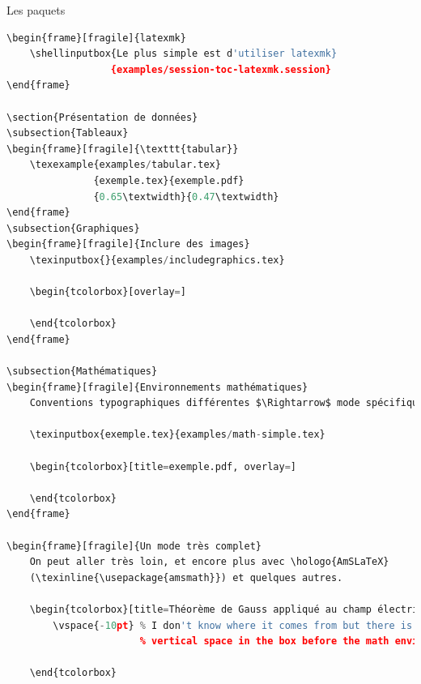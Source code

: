 \documentclass[usenames,dvipsnames,10pt]{beamer} %
\newcommand{\texinputbox}[2]{
    \begin{tcolorbox}[title=#1,colframe=PineGreen]
        \selectlanguage{english}
        \texinput{#2}
    \end{tcolorbox}
}
\newcommand{\texexample}[5]{
    \begin{columns}
        \begin{column}{#4}
            \texinputbox{#2}{#1}
        \end{column}

        \begin{column}{#5}
            \begin{tcolorbox}[title=#3, overlay=]
                
            \end{tcolorbox}
        \end{column}
    \end{columns}
}
\newcommand{\shellinputbox}[2]{
    \begin{tcolorbox}[title=#1,overlay=,colframe=Violet]
        \selectlanguage{english}
        \shellinput{#2}
    \end{tcolorbox}
}
\begin{document}
\begin{frame}[fragile]{Les paquets}
\begin{description}
{\begin{lstlisting}[language=Python]
\begin{frame}[fragile]{latexmk}
    \shellinputbox{Le plus simple est d'utiliser latexmk}
                  {examples/session-toc-latexmk.session}
\end{frame}

\section{Présentation de données}
\subsection{Tableaux}
\begin{frame}[fragile]{\texttt{tabular}}
    \texexample{examples/tabular.tex}
               {exemple.tex}{exemple.pdf}
               {0.65\textwidth}{0.47\textwidth}
\end{frame}
\subsection{Graphiques}
\begin{frame}[fragile]{Inclure des images}
    \texinputbox{}{examples/includegraphics.tex}

    \begin{tcolorbox}[overlay=]
        
    \end{tcolorbox}
\end{frame}

\subsection{Mathématiques}
\begin{frame}[fragile]{Environnements mathématiques}
    Conventions typographiques différentes $\Rightarrow$ mode spécifique:

    \texinputbox{exemple.tex}{examples/math-simple.tex}

    \begin{tcolorbox}[title=exemple.pdf, overlay=]
        
    \end{tcolorbox}
\end{frame}

\begin{frame}[fragile]{Un mode très complet}
    On peut aller très loin, et encore plus avec \hologo{AmSLaTeX}
    (\texinline{\usepackage{amsmath}}) et quelques autres.

    \begin{tcolorbox}[title=Théorème de Gauss appliqué au champ électrique, overlay=]
        \vspace{-10pt} % I don't know where it comes from but there is an extra
                       % vertical space in the box before the math environment.
        
    \end{tcolorbox}


\end{lstlisting}}
\end{description}
\end{frame}
\end{document}
